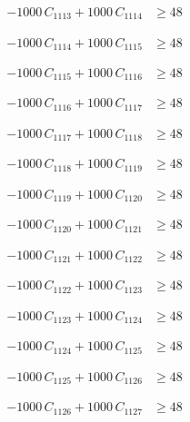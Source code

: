 \documentclass[a4paper,11pt]{article}
\begin{document}
\begin{align}
-1000\,C_{1113} + 1000\,C_{1114} &\geq 48 \nonumber
\end{align}

\begin{align}
-1000\,C_{1114} + 1000\,C_{1115} &\geq 48 \nonumber
\end{align}

\begin{align}
-1000\,C_{1115} + 1000\,C_{1116} &\geq 48 \nonumber
\end{align}

\begin{align}
-1000\,C_{1116} + 1000\,C_{1117} &\geq 48 \nonumber
\end{align}

\begin{align}
-1000\,C_{1117} + 1000\,C_{1118} &\geq 48 \nonumber
\end{align}

\begin{align}
-1000\,C_{1118} + 1000\,C_{1119} &\geq 48 \nonumber
\end{align}

\begin{align}
-1000\,C_{1119} + 1000\,C_{1120} &\geq 48 \nonumber
\end{align}

\begin{align}
-1000\,C_{1120} + 1000\,C_{1121} &\geq 48 \nonumber
\end{align}

\begin{align}
-1000\,C_{1121} + 1000\,C_{1122} &\geq 48 \nonumber
\end{align}

\begin{align}
-1000\,C_{1122} + 1000\,C_{1123} &\geq 48 \nonumber
\end{align}

\begin{align}
-1000\,C_{1123} + 1000\,C_{1124} &\geq 48 \nonumber
\end{align}

\begin{align}
-1000\,C_{1124} + 1000\,C_{1125} &\geq 48 \nonumber
\end{align}

\begin{align}
-1000\,C_{1125} + 1000\,C_{1126} &\geq 48 \nonumber
\end{align}

\begin{align}
-1000\,C_{1126} + 1000\,C_{1127} &\geq 48 \nonumber
\end{align}
\end{document}
